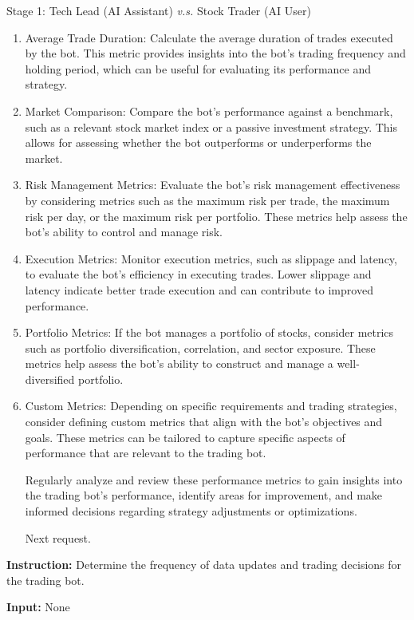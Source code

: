 \begin{AIBoxBreak}{Stage 1: Tech Lead (AI Assistant) \textit{v.s.} Stock Trader (AI User)}
\begin{enumerate}
\item  Average Trade Duration: Calculate the average duration of trades executed by the bot. This metric provides insights into the bot’s trading frequency and holding period, which can be useful for evaluating its performance and strategy.

\item  Market Comparison: Compare the bot’s performance against a benchmark, such as a relevant stock market index or a passive investment strategy. This allows for assessing whether the bot outperforms or underperforms the market.

\item  Risk Management Metrics: Evaluate the bot’s risk management effectiveness by considering metrics such as the maximum risk per trade, the maximum risk per day, or the maximum risk per portfolio. These metrics help assess the bot’s ability to control and manage risk.

\item  Execution Metrics: Monitor execution metrics, such as slippage and latency, to evaluate the bot’s efficiency in executing trades. Lower slippage and latency indicate better trade execution and can contribute to improved performance.

\item  Portfolio Metrics: If the bot manages a portfolio of stocks, consider metrics such as portfolio diversification, correlation, and sector exposure. These metrics help assess the bot’s ability to construct and manage a well-diversified portfolio.

\item  Custom Metrics: Depending on specific requirements and trading strategies, consider defining custom metrics that align with the bot’s objectives and goals. These metrics can be tailored to capture specific aspects of performance that are relevant to the trading bot.

Regularly analyze and review these performance metrics to gain insights into the trading bot’s performance, identify areas for improvement, and make informed decisions regarding strategy adjustments or optimizations.

Next request.
\end{enumerate}


\usermsg

\textbf{Instruction:} Determine the frequency of data updates and trading decisions for the trading bot.

\textbf{Input:} None



\end{AIBoxBreak}
